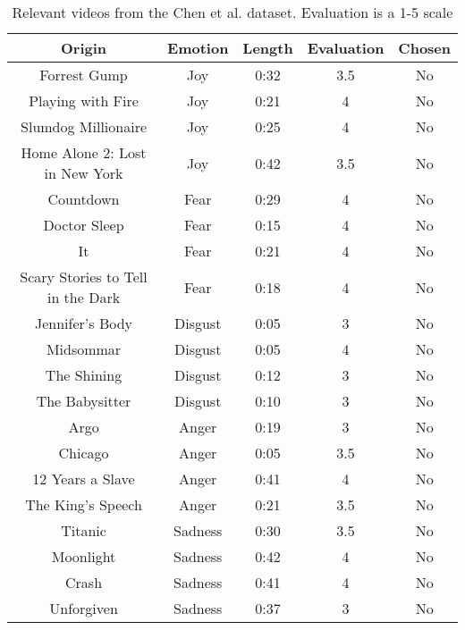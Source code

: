 \begin{table}[]
    \centering
    \begin{tabular}{|c|c|c|c|c|}
        \hline
        Origin & Emotion & Length & Evaluation  & Chosen  \\ \hline
        Forrest Gump & Joy & 0:32 & 3.5 & No \\ \hline
        Playing with Fire & Joy & 0:21 & 4 & No \\ \hline
        Slumdog Millionaire & Joy & 0:25 & 4 & No \\ \hline
        Home Alone 2: Lost in New York & Joy & 0:42 & 3.5 & No \\ \hline
        Countdown & Fear & 0:29 & 4 & No \\ \hline
        Doctor Sleep & Fear & 0:15 & 4 & No \\ \hline
        It & Fear & 0:21 & 4 & No \\ \hline
        Scary Stories to Tell in the Dark & Fear & 0:18 & 4 & No \\ \hline
        Jennifer's Body & Disgust & 0:05 & 3 & No \\ \hline
        Midsommar & Disgust & 0:05 & 4 & No \\ \hline
        The Shining & Disgust & 0:12 & 3 & No \\ \hline
        The Babysitter & Disgust & 0:10 & 3 & No \\ \hline
        Argo & Anger & 0:19 & 3 & No \\ \hline
        Chicago & Anger & 0:05 & 3.5 & No \\ \hline
        12 Years a Slave & Anger & 0:41 & 4 & No \\ \hline
        The King's Speech & Anger & 0:21 & 3.5 & No \\ \hline
        Titanic & Sadness & 0:30 & 3.5 & No \\ \hline
        Moonlight & Sadness & 0:42 & 4 & No \\ \hline
        Crash & Sadness & 0:41 & 4 & No \\ \hline
        Unforgiven & Sadness & 0:37 & 3 & No \\ \hline
    \end{tabular}
    \caption{Relevant videos from the Chen et al. dataset. Evaluation is a 1-5 scale \cite{CHEN2021106662}}
    \label{tab:chenVideos}
\end{table}
